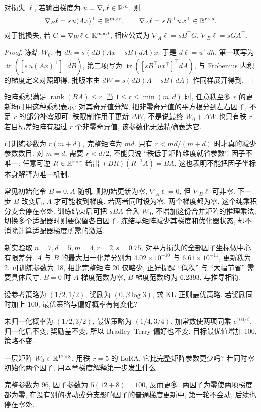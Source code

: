 \begin{proposition}
对损失 $\ell$, 若输出梯度为 $u=\nabla_h\ell\in\mathbb R^m$, 则
\[
\nabla_B\ell=s\,u(Ax)^\top\in\mathbb R^{m\times r},\qquad
\nabla_A\ell=s\,B^\top u\,x^\top\in\mathbb R^{r\times d}.
\]
对于批损失, 若 $G=\nabla_W\ell\in\mathbb R^{m\times d}$, 相应公式为 $\nabla_A\ell=sB^\top G$, $\nabla_B\ell=sGA^\top$.
\end{proposition}
\begin{proof}
冻结 $W_0$, 有 $dh=s(dB)Ax+sB(dA)x$. 于是 $d\ell=u^\top dh$. 第一项写为 $\operatorname{tr}([s\,u(Ax)^\top]^\top dB)$, 第二项写为 $\operatorname{tr}([sB^\top ux^\top]^\top dA)$, 与 Frobenius 内积的梯度定义对照即得. 批版本由 $dW=s(dB)A+sB(dA)$ 作同样展开得到.
\end{proof}
矩阵乘积满足 $\operatorname{rank}(BA)\le r$. 当 $1\le r\le\min(m,d)$ 时, 任意秩至多 $r$ 的更新均可用这种乘积表示: 对其奇异值分解, 把非零奇异值的平方根分到左右因子, 不足 $r$ 的部分补零即可. 秩限制作用于更新 $\Delta W$, 不是说最终 $W_0+\Delta W$ 也只有秩 $r$. 若目标差矩阵有超过 $r$ 个非零奇异值, 该参数化无法精确表达它.

可训练参数为 $r(m+d)$, 完整矩阵为 $md$. 只有 $r<md/(m+d)$ 时才真的减少参数数目. 对 $m=d$, 需要 $r<d/2$, 不能只说 ``秩低于矩阵维度就省参数''. 因子不唯一: 任意可逆 $R\in\mathbb R^{r\times r}$ 给出 $(BR)(R^{-1}A)=BA$, 这也表明不能把因子坐标本身解释为唯一机制.

常见初始化令 $B=0,A$ 随机, 则初始更新为零, $\nabla_A\ell=0$, 但 $\nabla_B\ell$ 可非零. 下一步 $B$ 改变后, $A$ 才可能收到梯度. 若两者同时设为零, 两个梯度都为零, 这个纯乘积分支会停在零处. 训练结束后可把 $sBA$ 合入 $W_0$, 不增加这份合并矩阵的推理乘法; 切换多个适配器时则要保留各自因子. 冻结基矩阵减少其梯度和优化器状态, 却不消除计算适配器梯度所需的激活.

新实验取 $n=7,d=5,m=4,r=2,s=0.75$, 对平方损失的全部因子坐标做中心有限差分. $A$ 与 $B$ 的最大归一化差分别为 $4.02\times10^{-10}$ 与 $6.61\times10^{-11}$, 更新秩为 2. 可训练参数为 18, 相比完整矩阵 20 仅略少, 正好提醒 ``低秩'' 与 ``大幅节省'' 需要具体尺寸. $B=0$ 时 $A$ 梯度范数为零, $B$ 梯度范数约为 6.2393, 与推导相符.


\begin{exercise}
设参考策略为 $(1/2,1/2)$, 奖励为 $(0,\beta\log3)$, 求 KL 正则最优策略. 若奖励同时加上 100, 最优策略与偏好概率有何变化?
\end{exercise}
\begin{solution}
未归一化概率为 $(1/2,3/2)$, 最优策略为 $(1/4,3/4)$. 加常数使两项同乘 $e^{100/\beta}$, 归一化后不变; 奖励差不变, 所以 Bradley--Terry 偏好也不变. 目标最优值增加 100, 策略不变.
\end{solution}
\begin{exercise}
一层矩阵 $W_0\in\mathbb R^{12\times8}$, 用秩 $r=5$ 的 LoRA. 它比完整矩阵参数更少吗? 若同时零初始化两个因子, 用本章梯度解释第一步发生什么.
\end{exercise}
\begin{solution}
完整参数为 96, 因子参数为 $5(12+8)=100$, 反而更多. 两因子为零使两项梯度都为零, 在没有别的扰动或分支影响因子的普通梯度更新中, 第一轮不会动, 后续也停在零处.
\end{solution}
\label{ch:end:posttrain}\label{ch:end:08}
